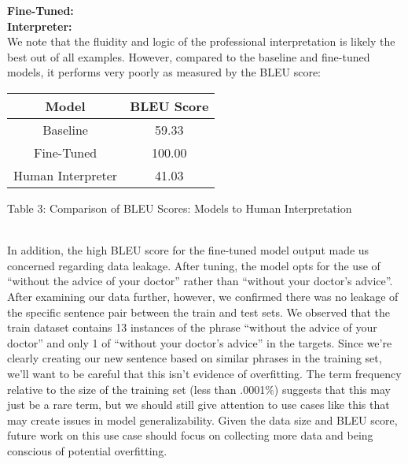 \documentclass{article}
\begin{document}
\begin{multicols}{2}
\textbf{Fine-Tuned: }\\

\textbf{Interpreter: }\\

We note that the fluidity and logic of the professional interpretation is likely the best out of all examples.
However, compared to the baseline and fine-tuned models, it performs very poorly as measured by the BLEU score:

\begingroup
\centering
\begin{tabular}{|c|c|}
\hline
Model & BLEU Score\\
\hline
\small{Baseline} & \small{59.33} \\
\small{Fine-Tuned} & \small{100.00} \\
\small{Human Interpreter} & \small{41.03} \\
\hline
\end{tabular}
\caption{\small{Table 3: Comparison of BLEU Scores: Models to Human Interpretation}}
\label{table:ta}
\endgroup
\\

In addition, the high BLEU score for the fine-tuned model output made us concerned regarding data leakage. After tuning, the model opts for the use of “without the advice of your doctor” rather than “without your doctor’s advice”. After examining our data further, however, we confirmed there was no leakage of the specific sentence pair between the train and test sets. We observed that the train dataset contains 13 instances of the phrase “without the advice of your doctor” and only 1 of “without your doctor’s advice” in the targets. Since we’re clearly creating our new sentence based on similar phrases in the training set, we’ll want to be careful that this isn’t evidence of overfitting. The term frequency relative to the size of the training set (less than .0001$\%$) suggests that this may just be a rare term, but we should still give attention to use cases like this that may create issues in model generalizability. Given the data size and BLEU score, future work on this use case should focus on collecting more data and being conscious of potential overfitting.


\end{multicols}
\end{document}
